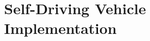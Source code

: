 \documentclass[ %
                    author={Alexander Hill},
                supervisor={Dr. Benjamin Sach},
                    degree={MEng},
                     title={MARMOSET},
                  subtitle={Multi-Agent Route Management using Online Simulation for Efficient Transportation},
                      type={research},
                      year={2016} ]{dissertation}
\begin{document}

%
%

\backmatter





\appendix

\chapter{Self-Driving Vehicle Implementation}
\label{appx:example}




\end{document}
